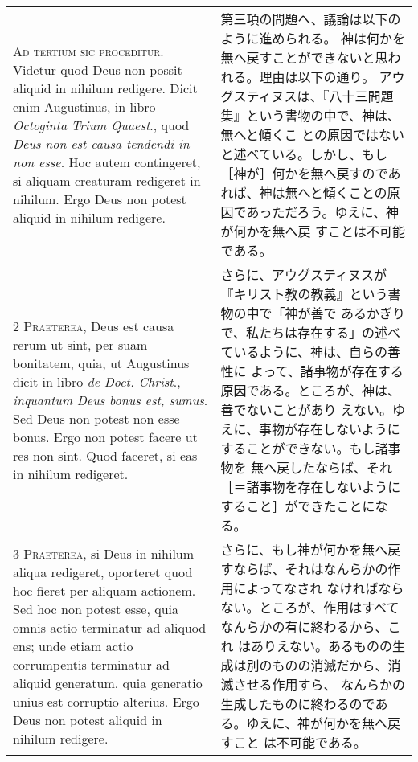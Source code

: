 \documentclass[10pt]{jsarticle} %
\begin{document}
\begin{longtable}{p{21em}p{21em}}

{\huge A}{\scshape d tertium sic proceditur}. Videtur quod Deus non
possit aliquid in nihilum redigere. Dicit enim Augustinus, in libro
{\itshape Octoginta Trium Quaest}., quod {\itshape Deus non est causa
tendendi in non esse}. Hoc autem contingeret, si aliquam creaturam
redigeret in nihilum. Ergo Deus non potest aliquid in nihilum redigere.


&


第三項の問題へ、議論は以下のように進められる。
神は何かを無へ戻すことができないと思われる。理由は以下の通り。
アウグスティヌスは、『八十三問題集』という書物の中で、神は、無へと傾くこ
 との原因ではないと述べている。しかし、もし［神が］何かを無へ戻すのであ
 れば、神は無へと傾くことの原因であっただろう。ゆえに、神が何かを無へ戻
 すことは不可能である。

\\


{\scshape 2 Praeterea}, Deus est causa rerum ut sint, per suam
bonitatem, quia, ut Augustinus dicit in libro {\itshape de
Doct. Christ}., {\itshape inquantum Deus bonus est, sumus}. Sed Deus non
potest non esse bonus. Ergo non potest facere ut res non sint. Quod
faceret, si eas in nihilum redigeret.

&
さらに、アウグスティヌスが『キリスト教の教義』という書物の中で「神が善で
 あるかぎりで、私たちは存在する」の述べているように、神は、自らの善性に
 よって、諸事物が存在する原因である。ところが、神は、善でないことがあり
 えない。ゆえに、事物が存在しないようにすることができない。もし諸事物を
 無へ戻したならば、それ［＝諸事物を存在しないようにすること］ができたことになる。

\\


{\scshape 3 Praeterea}, si Deus in nihilum aliqua
redigeret, oporteret quod hoc fieret per aliquam actionem. Sed hoc non
potest esse, quia omnis actio terminatur ad aliquod ens; unde etiam
actio corrumpentis terminatur ad aliquid generatum, quia generatio unius
est corruptio alterius. Ergo Deus non potest aliquid in nihilum
redigere.

&


さらに、もし神が何かを無へ戻すならば、それはなんらかの作用によってなされ
 なければならない。ところが、作用はすべてなんらかの有に終わるから、これ
 はありえない。あるものの生成は別のものの消滅だから、消滅させる作用すら、
 なんらかの生成したものに終わるのである。ゆえに、神が何かを無へ戻すこと
 は不可能である。


\end{longtable}
\end{document}
